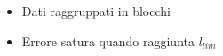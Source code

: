\begin{frame}
\begin{columns}
\begin{column}{0.45\textwidth}
            \vspace{0.5cm}

            \begin{itemize}[itemsep=0.5em, label=$\diamond$]
                \item Dati raggruppati in blocchi
                \item Errore satura quando raggiunta $l_{lim}$
            \end{itemize}
            
        \end{column}
      \end{columns}
  
\end{frame}